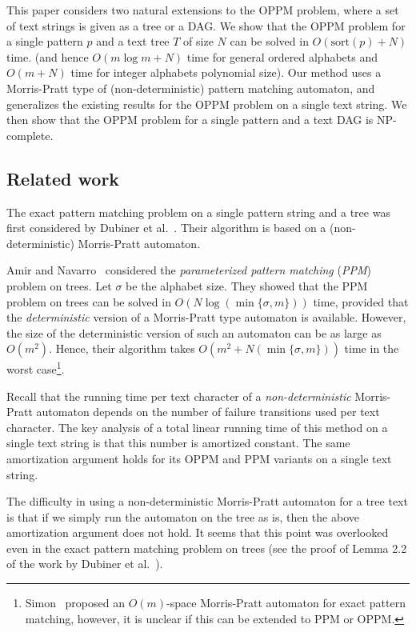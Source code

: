 \documentclass[a4paper,11pt]{article}
\newcommand{\sort}{\mathrm{sort}}
\begin{document}
This paper considers two natural extensions to the OPPM problem,
where a set of text strings is given as a tree or a DAG.
We show that the OPPM problem for a single pattern $p$
and a text tree $T$ of size $N$ can be solved in $O(\sort(p)+N)$ time.
(and hence $O(m \log m + N)$ time for general ordered alphabets and
$O(m+N)$ time for integer alphabets polynomial size).
Our method uses a Morris-Pratt type of (non-deterministic)
pattern matching automaton, and 
generalizes the existing results for the OPPM problem
on a single text string.
We then show that the OPPM problem for a single pattern
and a text DAG is NP-complete.

\subsection*{Related work}

The exact pattern matching problem on a single pattern string
and a tree was first considered by Dubiner et al.~\cite{DubinerGM94}.
Their algorithm is based on a (non-deterministic) Morris-Pratt automaton.

Amir and Navarro~\cite{AmirN09} considered
the \emph{parameterized pattern matching} (\emph{PPM}) problem on trees.
Let $\sigma$ be the alphabet size.
They showed that the PPM problem on trees can be solved in
$O(N \log(\min\{\sigma, m\}))$ time, 
provided that the \emph{deterministic} version of
a Morris-Pratt type automaton is available.
However, the size of the deterministic version of such an automaton
can be as large as $O(m^2)$.
Hence, their algorithm takes $O(m^2 + N(\min\{\sigma, m\}))$
time in the worst case\footnote{Simon~\cite{Simon94} proposed
  an $O(m)$-space Morris-Pratt automaton
  for exact pattern matching, however, it is unclear if this can be extended to PPM or OPPM.}.

Recall that the running time per text character of
a \emph{non-deterministic} Morris-Pratt automaton depends
on the number of failure transitions used per text character.
The key analysis of a total linear running time
of this method on a single text string
is that this number is amortized constant.
The same amortization argument holds for its OPPM and PPM variants
on a single text string.

The difficulty in using a non-deterministic Morris-Pratt automaton for
a tree text is that if we simply run the automaton on the tree as is,
then the above amortization argument does not hold.
It seems that this point was overlooked even in the
exact pattern matching problem on trees (see the proof of Lemma 2.2
of the work by Dubiner et al.~\cite{DubinerGM94}).
\end{document}
